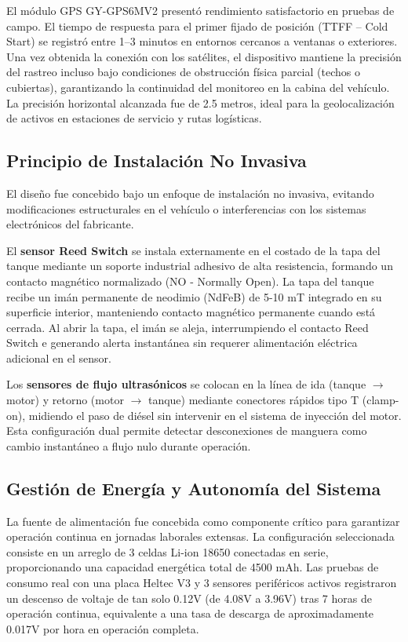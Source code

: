 \documentclass[twocolumn, 10pt]{article}
\begin{document}
El módulo GPS GY-GPS6MV2 presentó rendimiento satisfactorio en pruebas de campo. El tiempo de respuesta para el primer fijado de posición (TTFF -- Cold Start) se registró entre 1--3 minutos en entornos cercanos a ventanas o exteriores. Una vez obtenida la conexión con los satélites, el dispositivo mantiene la precisión del rastreo incluso bajo condiciones de obstrucción física parcial (techos o cubiertas), garantizando la continuidad del monitoreo en la cabina del vehículo. La precisión horizontal alcanzada fue de 2.5 metros, ideal para la geolocalización de activos en estaciones de servicio y rutas logísticas.

\subsection*{Principio de Instalación No Invasiva}

El diseño fue concebido bajo un enfoque de instalación no invasiva, evitando modificaciones estructurales en el vehículo o interferencias con los sistemas electrónicos del fabricante. 

El \textbf{sensor Reed Switch} se instala externamente en el costado de la tapa del tanque mediante un soporte industrial adhesivo de alta resistencia, formando un contacto magnético normalizado (NO - Normally Open). La tapa del tanque recibe un imán permanente de neodimio (NdFeB) de 5-10 mT integrado en su superficie interior, manteniendo contacto magnético permanente cuando está cerrada. Al abrir la tapa, el imán se aleja, interrumpiendo el contacto Reed Switch e generando alerta instantánea sin requerer alimentación eléctrica adicional en el sensor.

Los \textbf{sensores de flujo ultrasónicos} se colocan en la línea de ida (tanque $\rightarrow$ motor) y retorno (motor $\rightarrow$ tanque) mediante conectores rápidos tipo T (clamp-on), midiendo el paso de diésel sin intervenir en el sistema de inyección del motor. Esta configuración dual permite detectar desconexiones de manguera como cambio instantáneo a flujo nulo durante operación.

\subsection*{Gestión de Energía y Autonomía del Sistema}

La fuente de alimentación fue concebida como componente crítico para garantizar operación continua en jornadas laborales extensas. La configuración seleccionada consiste en un arreglo de 3 celdas Li-ion 18650 conectadas en serie, proporcionando una capacidad energética total de 4500 mAh. Las pruebas de consumo real con una placa Heltec V3 y 3 sensores periféricos activos registraron un descenso de voltaje de tan solo 0.12V (de 4.08V a 3.96V) tras 7 horas de operación continua, equivalente a una tasa de descarga de aproximadamente 0.017V por hora en operación completa.
\end{document}
